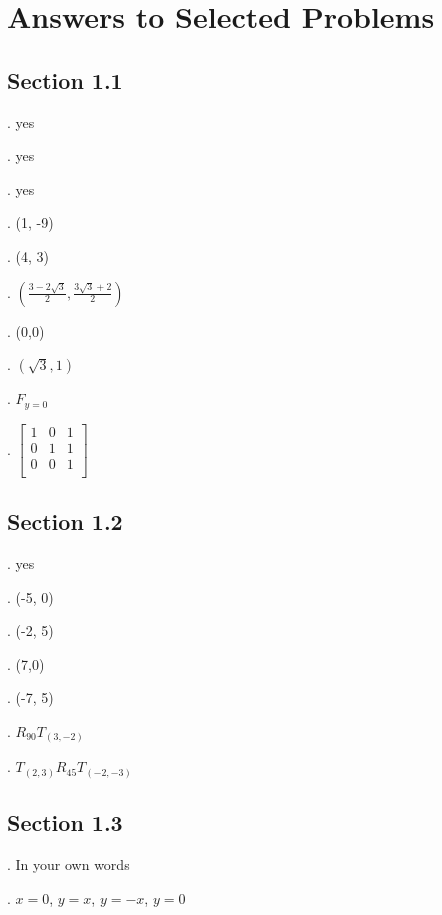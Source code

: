 
\chapter*{Answers to Selected Problems}

\section*{Section 1.1}

. yes

.  yes

.  yes

.  (1, -9)

.  (4, 3)

.  $\left ( \frac{3-2\sqrt{3}}{2}, \frac{3\sqrt{3} + 2}{2} \right )$

.  (0,0)

.  $(\sqrt{3}, 1)$

.  $F_{y=0}$

.   $ \left [  \begin{matrix} 
      1 & 0 & 1 \\
      0 & 1 & 1 \\
      0 & 0 & 1 \\
   \end{matrix} \right ]$


\section*{Section 1.2}

. yes

.  (-5, 0)

.  (-2, 5)

.  (7,0)

.  (-7, 5)

.  $R_{90} T_{(3, -2)}$

.  $T_{(2,3)} R_{45} T_{(-2, -3)}$


\section*{Section 1.3}

.  In your own words

.  $x = 0$, $y = x$, $y = -x$, $y = 0$

